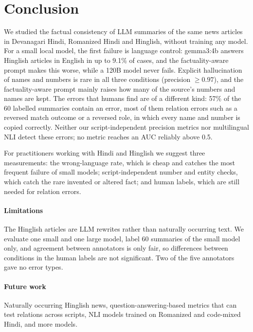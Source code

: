 \section{Conclusion}
\label{sec:conclusion}

We studied the factual consistency of LLM summaries of the same news articles in Devanagari Hindi, Romanized Hindi and Hinglish, without training any model. For a small local model, the first failure is language control: gemma3:4b answers Hinglish articles in English in up to 9.1\% of cases, and the factuality-aware prompt makes this worse, while a 120B model never fails. Explicit hallucination of names and numbers is rare in all three conditions (precision $\geq 0.97$), and the factuality-aware prompt mainly raises how many of the source's numbers and names are kept. The errors that humans find are of a different kind: 57\% of the 60 labelled summaries contain an error, most of them relation errors such as a reversed match outcome or a reversed role, in which every name and number is copied correctly. Neither our script-independent precision metrics nor multilingual NLI detect these errors; no metric reaches an AUC reliably above 0.5.

For practitioners working with Hindi and Hinglish we suggest three measurements: the wrong-language rate, which is cheap and catches the most frequent failure of small models; script-independent number and entity checks, which catch the rare invented or altered fact; and human labels, which are still needed for relation errors.

\paragraph{Limitations} The Hinglish articles are LLM rewrites rather than naturally occurring text. We evaluate one small and one large model, label 60 summaries of the small model only, and agreement between annotators is only fair, so differences between conditions in the human labels are not significant. Two of the five annotators gave no error types.

\paragraph{Future work} Naturally occurring Hinglish news, question-answering-based metrics that can test relations across scripts, NLI models trained on Romanized and code-mixed Hindi, and more models.

